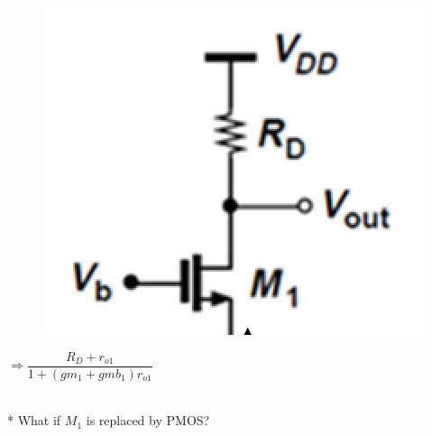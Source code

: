 \documentclass{beamer}
\begin{document}
\begin{frame}
\begin{minipage}{0.55\linewidth}
        \begin{minipage}{0.26\linewidth}
            \begin{figure}[H]
                \includegraphics[width=1.1\linewidth]{Rin26}
            \end{figure}
        \end{minipage}
        $\Rightarrow \dfrac{R_{D}+r_{o1}}{1+(gm_1+gmb_1) r_{o1}}$ 
    \end{minipage}\\
    * What if $M_1$ is replaced by PMOS? 
\end{frame}
\end{document}
